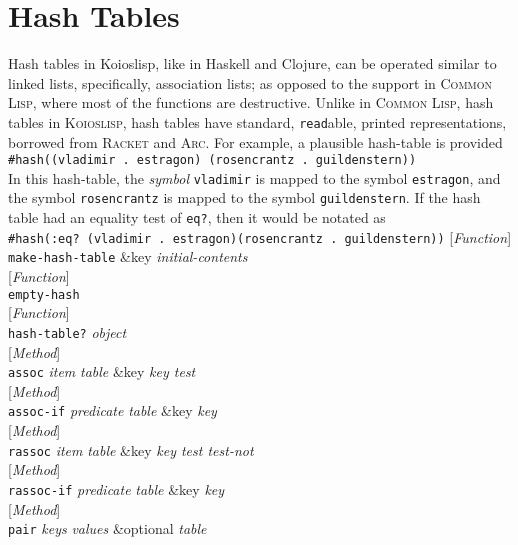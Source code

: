 \documentclass[10pt]{book}
\newenvironment{defother}[2]{[\textit{#1}]\\\texttt{#2}}{\\}
\newenvironment{defun}[1]{\begin{defother}{Function}{#1}}{\end{defother}}
\newenvironment{defmethod}[1]{\begin{defother}{Method}{#1}}{\end{defother}}
\begin{document}
\chapter{Hash Tables}
Hash tables in Koioslisp, like in Haskell and Clojure, can be operated similar to linked lists, specifically, association lists; as opposed to the support in \textsc{Common Lisp}, where most of the functions are destructive. Unlike in \textsc{Common Lisp}, hash tables in \textsc{Koioslisp}, hash tables have standard, \texttt{read}able, printed representations, borrowed from \textsc{Racket} and \textsc{Arc}. For example, a plausible hash-table is provided\\ \texttt{\#hash((vladimir . estragon) (rosencrantz . guildenstern))}\\ In this hash-table, the \textit{symbol} \texttt{vladimir} is mapped to the symbol \texttt{estragon}, and the symbol \texttt{rosencrantz} is mapped to the symbol \texttt{guildenstern}. If the hash table had an equality test of \texttt{eq?}, then it would be notated as\\
\texttt{\#hash(:eq? (vladimir . estragon)(rosencrantz . guildenstern))}
\begin{defun}{make-hash-table} \&key {\it initial-contents}\end{defun}
\begin{defun}{empty-hash}\end{defun}
\begin{defun}{hash-table?} \textit{object}\end{defun}
\begin{defmethod}{assoc} \textit{item} \textit{table} \&key {\it key test} \end{defmethod}
\begin{defmethod}{assoc-if} \textit{predicate} \textit{table} \&key \textit{key}\end{defmethod}
\begin{defmethod}{rassoc} \textit{item} \textit{table} \&key {\it key test test-not}\end{defmethod}
\begin{defmethod}{rassoc-if} \textit{predicate} \textit{table} \&key \textit{key} \end{defmethod}
\begin{defmethod}{pair} \textit{keys} \textit{values} \&optional \textit{table}\end{defmethod}
\end{document}
